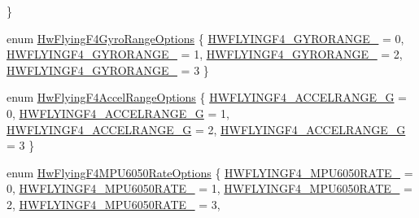 \begin{DoxyCompactItemize}
 \}
\item 
enum \hyperlink{group___hw_flying_f4_gaff8bc87e9b8eab840f02c443347f65a1}{\-Hw\-Flying\-F4\-Gyro\-Range\-Options} \{ \hyperlink{group___hw_flying_f4_ggaff8bc87e9b8eab840f02c443347f65a1aeda87bbf6f157be6c0498a560ed52628}{\-H\-W\-F\-L\-Y\-I\-N\-G\-F4\-\_\-\-G\-Y\-R\-O\-R\-A\-N\-G\-E\-\_} = 0, 
\hyperlink{group___hw_flying_f4_ggaff8bc87e9b8eab840f02c443347f65a1a4f5bc345699d899cf8ee339f42daa1ee}{\-H\-W\-F\-L\-Y\-I\-N\-G\-F4\-\_\-\-G\-Y\-R\-O\-R\-A\-N\-G\-E\-\_} = 1, 
\hyperlink{group___hw_flying_f4_ggaff8bc87e9b8eab840f02c443347f65a1ac9bf01e28e09bb74be3d25cf2dd3a9b0}{\-H\-W\-F\-L\-Y\-I\-N\-G\-F4\-\_\-\-G\-Y\-R\-O\-R\-A\-N\-G\-E\-\_} = 2, 
\hyperlink{group___hw_flying_f4_ggaff8bc87e9b8eab840f02c443347f65a1afdc83f903509cb7d2d98c7051aa5f740}{\-H\-W\-F\-L\-Y\-I\-N\-G\-F4\-\_\-\-G\-Y\-R\-O\-R\-A\-N\-G\-E\-\_} = 3
 \}
\item 
enum \hyperlink{group___hw_flying_f4_ga42c6ec05ef8972667d82e0dff20a44e7}{\-Hw\-Flying\-F4\-Accel\-Range\-Options} \{ \hyperlink{group___hw_flying_f4_gga42c6ec05ef8972667d82e0dff20a44e7a3015f1890336ee7d5d34ae953dec4a6c}{\-H\-W\-F\-L\-Y\-I\-N\-G\-F4\-\_\-\-A\-C\-C\-E\-L\-R\-A\-N\-G\-E\-\_\-G} = 0, 
\hyperlink{group___hw_flying_f4_gga42c6ec05ef8972667d82e0dff20a44e7a487f1c9c20896bebb1638ab1e87dc4a2}{\-H\-W\-F\-L\-Y\-I\-N\-G\-F4\-\_\-\-A\-C\-C\-E\-L\-R\-A\-N\-G\-E\-\_\-G} = 1, 
\hyperlink{group___hw_flying_f4_gga42c6ec05ef8972667d82e0dff20a44e7a545d502f1a6cb5f771dbf386138ef75d}{\-H\-W\-F\-L\-Y\-I\-N\-G\-F4\-\_\-\-A\-C\-C\-E\-L\-R\-A\-N\-G\-E\-\_\-G} = 2, 
\hyperlink{group___hw_flying_f4_gga42c6ec05ef8972667d82e0dff20a44e7a502c6d70724b417a2164ec3c60e74398}{\-H\-W\-F\-L\-Y\-I\-N\-G\-F4\-\_\-\-A\-C\-C\-E\-L\-R\-A\-N\-G\-E\-\_\-G} = 3
 \}
\item 
enum \hyperlink{group___hw_flying_f4_ga4fb0c546e34432f404e17df66f4a5630}{\-Hw\-Flying\-F4\-M\-P\-U6050\-Rate\-Options} \{ \*
\hyperlink{group___hw_flying_f4_gga4fb0c546e34432f404e17df66f4a5630a001aa24166291333d3ccc09a700dce7d}{\-H\-W\-F\-L\-Y\-I\-N\-G\-F4\-\_\-\-M\-P\-U6050\-R\-A\-T\-E\-\_} = 0, 
\hyperlink{group___hw_flying_f4_gga4fb0c546e34432f404e17df66f4a5630a683fd3472c66d296736393b993d0170a}{\-H\-W\-F\-L\-Y\-I\-N\-G\-F4\-\_\-\-M\-P\-U6050\-R\-A\-T\-E\-\_} = 1, 
\hyperlink{group___hw_flying_f4_gga4fb0c546e34432f404e17df66f4a5630ad2a8f6946346ac3b1d55a842e04f9fd1}{\-H\-W\-F\-L\-Y\-I\-N\-G\-F4\-\_\-\-M\-P\-U6050\-R\-A\-T\-E\-\_} = 2, 
\hyperlink{group___hw_flying_f4_gga4fb0c546e34432f404e17df66f4a5630a9371384e48b7578d19f52be6f266f071}{\-H\-W\-F\-L\-Y\-I\-N\-G\-F4\-\_\-\-M\-P\-U6050\-R\-A\-T\-E\-\_} = 3, 

\end{DoxyCompactItemize}
